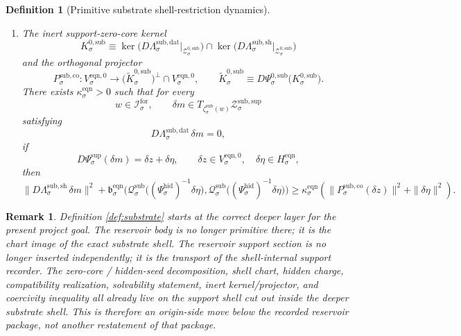 \documentclass[11pt]{article}
\newcommand{\ForSpace}[1]{\mathcal I_{#1}^{\mathrm{for}}}
\newcommand{\EqnPair}[1]{\mathfrak b_{#1}^{\mathrm{eqn}}}
\newcommand{\EqnZero}[1]{V_{#1}^{\mathrm{eqn},0}}
\newcommand{\EqnHidden}[1]{H_{#1}^{\mathrm{eqn}}}
\newcommand{\ShellChart}[1]{\Psi_{#1}^{\mathrm{sup}}}
\newcommand{\HiddenChart}[1]{\Psi_{#1}^{\mathrm{hid}}}
\newcommand{\SubData}[1]{\Lambda_{#1}^{\mathrm{sub,dat}}}
\newcommand{\SubShellMap}[1]{\Lambda_{#1}^{\mathrm{sub,sh}}}
\newcommand{\SubSupportShell}[1]{\mathcal Z_{#1}^{\mathrm{sub,sup}}}
\newcommand{\SubZeroCore}[1]{\mathcal Z_{#1}^{0,\mathrm{sub}}}
\newcommand{\SubZeroChart}[1]{\Psi_{#1}^{0,\mathrm{sub}}}
\newcommand{\SubCharge}[1]{\mathcal Q_{#1}^{\mathrm{sub}}}
\newcommand{\SubEmbed}[1]{\zeta_{#1}^{\mathrm{sub}}}
\newcommand{\SubKernel}[1]{K_{#1}^{0,\mathrm{sub}}}
\newcommand{\SubKernelCh}[1]{\widetilde K_{#1}^{0,\mathrm{sub}}}
\newcommand{\SubStateComp}[1]{P_{#1}^{\mathrm{sub,co}}}
\newtheorem{definition}{Definition}
\newtheorem{remark}{Remark}
\begin{document}
\begin{definition}[Primitive substrate shell-restriction dynamics]
\begin{enumerate}
    \begin{equation}
    \SubData{\sigma}\bigl(\SubZeroCore{\sigma}\bigr)
    =
    \SubData{\sigma}\Bigl(
    \SubZeroCore{\sigma}\cap
    \bigl(\SubShellMap{\sigma}\bigr)^{-1}(0)
    \Bigr).
    \label{eq:subsolvability}
    \end{equation}
    \item The inert support-zero-core kernel
    \[
    \SubKernel{\sigma}
    \equiv
    \ker\bigl(D\SubData{\sigma}\big|_{\SubZeroCore{\sigma}}\bigr)
    \cap
    \ker\bigl(D\SubShellMap{\sigma}\big|_{\SubZeroCore{\sigma}}\bigr)
    \]
    and the orthogonal projector
    \[
    \SubStateComp{\sigma}:
    \EqnZero{\sigma}\to
    \bigl(\SubKernelCh{\sigma}\bigr)^{\perp}\cap\EqnZero{\sigma},
    \qquad
    \SubKernelCh{\sigma}
    \equiv
    D\SubZeroChart{\sigma}\bigl(\SubKernel{\sigma}\bigr).
    \]
    There exists \(\kappa_{\sigma}^{\mathrm{eqn}}>0\) such that for every
    \[
    w\in\ForSpace{\sigma},
    \qquad
    \delta m\in T_{\SubEmbed{\sigma}(w)}\SubSupportShell{\sigma}
    \]
    satisfying
    \[
    D\SubData{\sigma}\,\delta m=0,
    \]
    if
    \[
    D\ShellChart{\sigma}(\delta m)=\delta z+\delta\eta,
    \qquad
    \delta z\in\EqnZero{\sigma},
    \quad
    \delta\eta\in\EqnHidden{\sigma},
    \]
    then
    \begin{equation}
    \|D\SubShellMap{\sigma}\,\delta m\|^{2}
    +
    \EqnPair{\sigma}\bigl(
    \SubCharge{\sigma}\bigl((\HiddenChart{\sigma})^{-1}\delta\eta\bigr),
    \SubCharge{\sigma}\bigl((\HiddenChart{\sigma})^{-1}\delta\eta\bigr)
    \bigr)
    \ge
    \kappa_{\sigma}^{\mathrm{eqn}}
    \left(
    \|\SubStateComp{\sigma}(\delta z)\|^{2}
    +
    \|\delta\eta\|^{2}
    \right).
    \label{eq:subcoercive}
    \end{equation}
\end{enumerate}
\end{definition}

\begin{remark}
Definition \ref{def:substrate} starts at the correct deeper layer for the present project goal. The reservoir body is no longer primitive there; it is the chart image of the exact substrate shell. The reservoir support section is no longer inserted independently; it is the transport of the shell-internal support recorder. The zero-core / hidden-seed decomposition, shell chart, hidden charge, compatibility realization, solvability statement, inert kernel/projector, and coercivity inequality all already live on the support shell cut out inside the deeper substrate shell. This is therefore an origin-side move below the recorded reservoir package, not another restatement of that package.
\end{remark}
\end{document}
